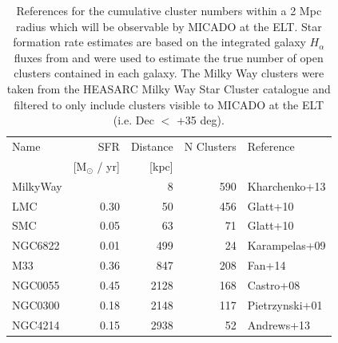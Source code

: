 
\begin{table}[]
    \centering
    \caption{References for the cumulative cluster numbers within a 2 Mpc radius
    which will be observable by MICADO at the ELT. Star formation rate estimates 
    are based on the integrated galaxy $H_{\alpha}$ fluxes from \citet{karachentsev2013}
    and were used to estimate the true number of open clusters contained in each
    galaxy. The Milky Way clusters were taken from the HEASARC Milky Way Star Cluster
    catalogue \citep{heasarc_mwsc} and filtered to only include clusters visible to 
    MICADO at the ELT (i.e. Dec $<$ +35 deg).
    }
    \label{tbl:cum_cluster_refs}
    \begin{tabular}{lrrrl}
    
    \hline
    \hline
    Name     & SFR                  & Distance  & N Clusters & Reference      \\
             & [M$_\odot$ / yr]     & [kpc]     &            &                \\
    \hline
    MilkyWay &                      & 8         & 590        & Kharchenko+13  \\
    LMC      & 0.30                 & 50        & 456        & Glatt+10       \\
    SMC      & 0.05                 & 63        & 71         & Glatt+10       \\
    NGC6822  & 0.01                 & 499       & 24         & Karampelas+09  \\
    M33      & 0.36                 & 847       & 208        & Fan+14         \\
    NGC0055  & 0.45                 & 2128      & 168        & Castro+08      \\
    NGC0300  & 0.18                 & 2148      & 117        & Pietrzynski+01 \\
    NGC4214  & 0.15                 & 2938      & 52         & Andrews+13     \\
    \hline
    \end{tabular}
\end{table}





